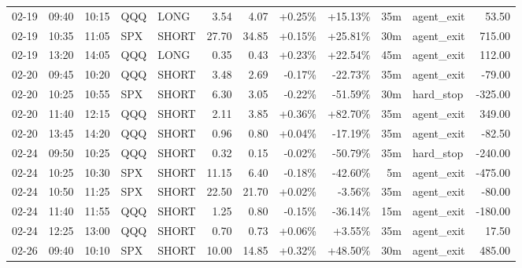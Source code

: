 \documentclass[11pt,a4paper,twoside]{article}
\begin{document}
\begin{center}
\begin{longtable}{>{\color{txtmain}}l l l l l r r r r r >{\color{txtmain}}l r}
02-19 & 09:40 & 10:15 & QQQ & LONG & 3.54 & 4.07 & \textcolor{wingreen}{+0.25\%} & \textcolor{wingreen}{+15.13\%} & 35m & agent\_exit & \textcolor{wingreen}{53.50} \\
02-19 & 10:35 & 11:05 & SPX & SHORT & 27.70 & 34.85 & \textcolor{wingreen}{+0.15\%} & \textcolor{wingreen}{+25.81\%} & 30m & agent\_exit & \textcolor{wingreen}{715.00} \\
02-19 & 13:20 & 14:05 & QQQ & LONG & 0.35 & 0.43 & \textcolor{wingreen}{+0.23\%} & \textcolor{wingreen}{+22.54\%} & 45m & agent\_exit & \textcolor{wingreen}{112.00} \\
02-20 & 09:45 & 10:20 & QQQ & SHORT & 3.48 & 2.69 & \textcolor{lossred}{-0.17\%} & \textcolor{lossred}{-22.73\%} & 35m & agent\_exit & \textcolor{lossred}{-79.00} \\
02-20 & 10:25 & 10:55 & SPX & SHORT & 6.30 & 3.05 & \textcolor{lossred}{-0.22\%} & \textcolor{lossred}{-51.59\%} & 30m & hard\_stop & \textcolor{lossred}{-325.00} \\
02-20 & 11:40 & 12:15 & QQQ & SHORT & 2.11 & 3.85 & \textcolor{wingreen}{+0.36\%} & \textcolor{wingreen}{+82.70\%} & 35m & agent\_exit & \textcolor{wingreen}{349.00} \\
02-20 & 13:45 & 14:20 & QQQ & SHORT & 0.96 & 0.80 & \textcolor{wingreen}{+0.04\%} & \textcolor{lossred}{-17.19\%} & 35m & agent\_exit & \textcolor{lossred}{-82.50} \\
02-24 & 09:50 & 10:25 & QQQ & SHORT & 0.32 & 0.15 & \textcolor{lossred}{-0.02\%} & \textcolor{lossred}{-50.79\%} & 35m & hard\_stop & \textcolor{lossred}{-240.00} \\
02-24 & 10:25 & 10:30 & SPX & SHORT & 11.15 & 6.40 & \textcolor{lossred}{-0.18\%} & \textcolor{lossred}{-42.60\%} & 5m & agent\_exit & \textcolor{lossred}{-475.00} \\
02-24 & 10:50 & 11:25 & SPX & SHORT & 22.50 & 21.70 & \textcolor{wingreen}{+0.02\%} & \textcolor{lossred}{-3.56\%} & 35m & agent\_exit & \textcolor{lossred}{-80.00} \\
02-24 & 11:40 & 11:55 & QQQ & SHORT & 1.25 & 0.80 & \textcolor{lossred}{-0.15\%} & \textcolor{lossred}{-36.14\%} & 15m & agent\_exit & \textcolor{lossred}{-180.00} \\
02-24 & 12:25 & 13:00 & QQQ & SHORT & 0.70 & 0.73 & \textcolor{wingreen}{+0.06\%} & \textcolor{wingreen}{+3.55\%} & 35m & agent\_exit & \textcolor{wingreen}{17.50} \\
02-26 & 09:40 & 10:10 & SPX & SHORT & 10.00 & 14.85 & \textcolor{wingreen}{+0.32\%} & \textcolor{wingreen}{+48.50\%} & 30m & agent\_exit & \textcolor{wingreen}{485.00} \\

\end{longtable}
\end{center}
\end{document}
